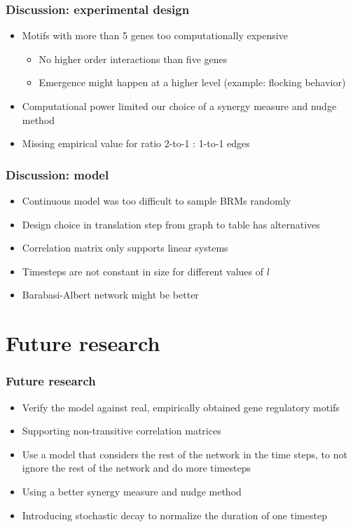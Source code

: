 \documentclass[hyperref={pdfpagelabels=false}]{beamer}
\begin{document}
\begin{frame}
\frametitle{Discussion: experimental design}
\begin{itemize}
\item Motifs with more than 5 genes too computationally expensive
\begin{itemize}
\item No higher order interactions than five genes
\item Emergence might happen at a higher level (example: flocking behavior)
\end{itemize}
\item Computational power limited our choice of a synergy measure and nudge method
\item Missing empirical value for ratio 2-to-1 : 1-to-1 edges
\end{itemize}
\end{frame}

\begin{frame}
\frametitle{Discussion: model}
\begin{itemize}
\item Continuous model was too difficult to sample BRMs randomly
\item Design choice in translation step from graph to table has alternatives
\item Correlation matrix only supports linear systems
\item Timesteps are not constant in size for different values of $l$
\item Barabasi-Albert network might be better
\end{itemize}
\end{frame}

\section{Future research}
\setcounter{subsection}{1}

\begin{frame}
\frametitle{Future research}
\begin{itemize}
\item Verify the model against real, empirically
obtained gene regulatory motifs
\item Supporting non-transitive correlation matrices
\item Use a model that considers the rest of the network in the time steps, to not ignore the rest of the network and do more timesteps
\item Using a better synergy measure and nudge method
\item Introducing stochastic decay to normalize the duration of one timestep
\end{itemize}
\end{frame}
\end{document}
